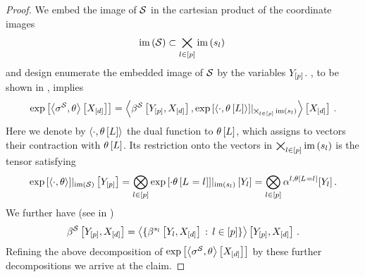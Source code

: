 \begin{proof}
    We embed the image of $\mathcal{S}$ in the cartesian product of the coordinate images  %
    \begin{align*}
        \mathrm{im}\left(\mathcal{S}\right) \subset \bigtimes_{l\in[p]} \mathrm{im}\left(s_{l}\right) \,
    \end{align*}
    and design enumerate the embedded image of $\mathcal{S}$ by the variables $Y_{[p]}$.
    , to be shown in , implies
    \begin{align*}
        \mathrm{exp}\left[\left\langle \sigma^{\mathcal{S}},\theta\right\rangle \left[ X_{[d]} \right]\right]
        = \left\langle 
            \beta^{\mathcal{S}}\left[Y_{[p]},X_{[d]}\right],{\mathrm{exp}\left[\braket{\cdot,\theta\left[L\right]}\right]
            }|_{\bigtimes_{l\in[p]}\mathrm{im}\left(s_{l}\right)}\right\rangle \left[ X_{[d]} \right] \, .
    \end{align*}
    Here we denote by $\braket{\cdot,\theta\left[L\right]}$ the dual function to $\theta\left[L\right]$, which assigns to vectors their contraction with $\theta\left[L\right]$.
    Its restriction onto the vectors in $\bigtimes_{l\in[p]}\mathrm{im}\left(s_{l}\right)$ is the tensor satisfying
    \begin{align*}
        {\mathrm{exp}\left[\braket{\cdot,\theta}\right]}|_{\mathrm{im}\left(\mathcal{S}\right)}\left[Y_{[p]}\right]
        = \bigotimes_{l\in[p]} {\mathrm{exp}\left[\cdot \theta\left[L_{}=l_{}\right]\right]}|_{\mathrm{im}\left(s_{l}\right)}\left[Y_{l}\right]
        = \bigotimes_{l\in[p]} \alpha^{l,\theta\left[L_{}=l_{}\right]}[Y_{l}] \, .
    \end{align*}
    We further have (see  in )
    \begin{align*}
        \beta^{\mathcal{S}}\left[Y_{[p]},X_{[d]}\right]
        = \left\langle \{\beta^{s_{l}}\left[Y_{l},X_{[d]}\right] \,:\,l\in[p]\}\right\rangle \left[ Y_{[p]},X_{[d]} \right] \, .
    \end{align*}
    Refining the above decomposition of $\mathrm{exp}\left[\left\langle \sigma^{\mathcal{S}},\theta\right\rangle \left[ X_{[d]} \right]\right]$ by these further decompositions we arrive at the claim.
\end{proof}


